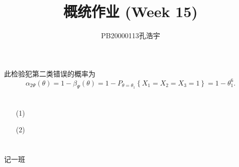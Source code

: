 \documentclass{article}
\title{概统作业 (Week 15)}
\author{PB20000113孔浩宇}
\begin{document}
\maketitle
\section{}  %
此检验犯第二类错误的概率为
\[
    \alpha_{2\Psi} (\theta)
    = 1 - \beta_{\Psi} (\theta)
    = 1 - P_{\theta = \theta_1} \left\{ X_1 = X_2 = X_3 = 1 \right\}    
    = 1 - \theta_1^6 .
\]

\section{}  %
\begin{enumerate}
    \item [(1)]
    \item [(2)]
\end{enumerate}

\section{}  %
记一班
\end{document}
